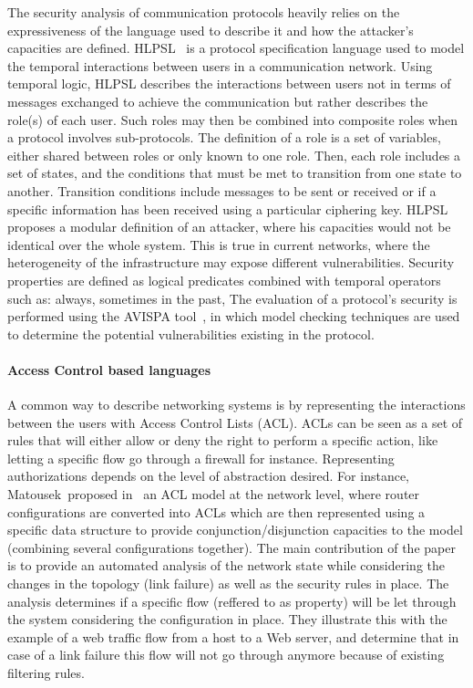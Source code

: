 The security analysis of communication protocols heavily relies on the expressiveness of the language used to describe it and how the attacker's capacities are defined. HLPSL~\cite{HLPSL-Chevalier2004} is a protocol specification language used to model the temporal interactions between users in a communication network. Using temporal logic, HLPSL describes the interactions between users not in terms of messages exchanged to achieve the communication but rather describes the role(s) of each user. Such roles may then be combined into composite roles when a protocol involves sub-protocols.
The definition of a role is a set of variables, either shared between roles or only known to one role.
Then, each role includes a set of states, and the conditions that must be met to transition from one state to another. Transition conditions include messages to be sent or received or if a specific information has been received using a particular ciphering key.
HLPSL proposes a modular definition of an attacker, where his capacities would not be identical over the whole system.
This is true in current networks, where the heterogeneity of the infrastructure may expose different vulnerabilities.
Security properties are defined as logical predicates combined with temporal operators such as: always, sometimes in the past, \etc
The evaluation of a protocol's security is performed using the AVISPA tool~\cite{avispa}, in which model checking techniques are used to determine the potential vulnerabilities existing in the protocol.

\paragraph{Access Control based languages}
A common way to describe networking systems is by representing the interactions between the users with Access Control Lists (ACL).
ACLs can be seen as a set of rules that will either allow or deny the right to perform a specific action, like letting a specific flow go through a firewall for instance.
Representing authorizations depends on the level of abstraction desired.
For instance, Matousek~\etal proposed in~\cite{Matousek2008} an ACL model at the network level, where router configurations are converted into ACLs which are then represented using a specific data structure to provide conjunction/disjunction capacities to the model (\ie combining several configurations together).
The main contribution of the paper is to provide an automated analysis of the network state while considering the changes in the topology (\ie link failure) as well as the security rules in place.
The analysis determines if a specific flow (reffered to as property) will be let through the system considering the configuration in place. They illustrate this with the example of a web traffic flow from a host to a Web server, and determine that in case of a link failure this flow will not go through anymore because of existing filtering rules.

